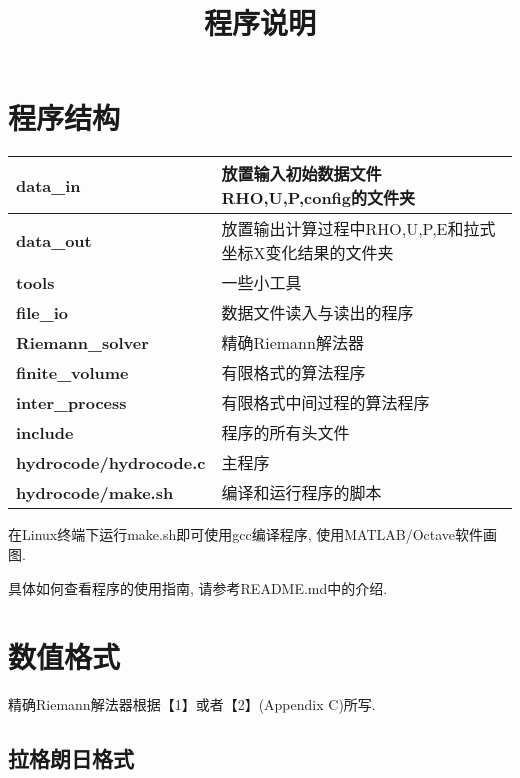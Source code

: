 \documentclass[CJK]{ctexart}
\begin{document}
\title{程序说明}
\date{}
\maketitle


\section{程序结构}

\begin{table}[htbp]
\begin{tabular}{|l|l|}
\hline
\textbf{data\_in}  & 放置输入初始数据文件RHO,U,P,config的文件夹\\
\hline
\textbf{data\_out} & 放置输出计算过程中RHO,U,P,E和拉式坐标X变化结果的文件夹\\
\hline
\textbf{tools}     & 一些小工具\\
\hline
\textbf{file\_io}  & 数据文件读入与读出的程序\\
\hline
\textbf{Riemann\_solver} & 精确Riemann解法器\\
\hline
\textbf{finite\_volume}  & 有限格式的算法程序\\
\hline
\textbf{inter\_process}   & 有限格式中间过程的算法程序\\
\hline
\textbf{include}         & 程序的所有头文件\\
\hline
\textbf{hydrocode/hydrocode.c} & 主程序\\
\hline
\textbf{hydrocode/make.sh}     & 编译和运行程序的脚本\\
\hline
\end{tabular}
\end{table}

在Linux终端下运行make.sh即可使用gcc编译程序, 使用MATLAB/Octave软件画图.

具体如何查看程序的使用指南, 请参考README.md中的介绍.


\section{数值格式}

精确Riemann解法器根据【1】或者【2】(Appendix C)所写.

\subsection{拉格朗日格式}
\end{document}
